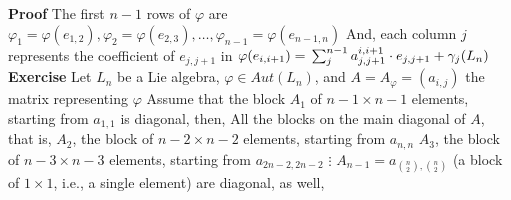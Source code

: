 \documentclass[12pt]{article}
\begin{document}
\textbf{Proof} \newline
The first $n-1$ rows of $\varphi$ are $\varphi_1=\varphi(e_{1,2}),\varphi_2=\varphi(e_{2,3}),\dots,
\varphi_{n-1}=\varphi(e_{n-1,n})$ \newline
And, each column $j$ represents the coefficient of $e_{j,j+1}$ in $\varphi(e_{i,i+1})= \newline
\sum_j^{n-1} a_{j,j+1}^{i,i+1} \cdot e_{j,j+1}+\gamma_j(L_n)$
\newpage
\textbf{Exercise} \newline
Let $L_n$ be a Lie algebra, $\varphi \in Aut(L_n)$, and $A=A_\varphi=(a_{i,j})$ the matrix representing $\varphi$ \newline
Assume that the block $A_1$ of $n-1 \times n-1$ elements, starting from $a_{1,1}$ is diagonal, then, \newline
All the blocks on the main diagonal of $A$, that is, \newline 
$A_2$, the block of $n-2 \times n-2$ elements, starting from $a_{n,n}$ \newline
$A_3$, the block of $n-3 \times n-3$ elements, starting from $a_{2n-2,2n-2}$ \newline
$\vdots$ \newline
$A_{n-1}=a_{\binom{n}{2},\binom{n}{2}}$ (a block of $1 \times 1$, i.e., a single element)\newline
are diagonal, as well, \newline
\end{document}
